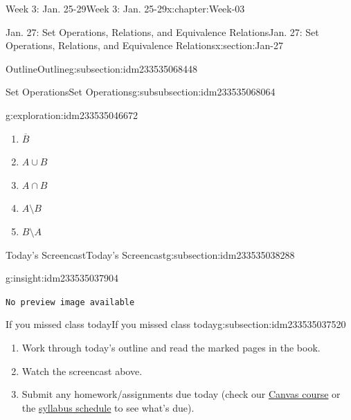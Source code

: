 \documentclass[oneside,10pt,]{book}
\newcommand{\mono}[1]{\texttt{#1}}
\numberwithin{equation}{section}
\newlength{\qrsize}
\newlength{\previewwidth}
\renewcommand{\bar}{\overline}
\begin{document}
\begin{chapterptx}{Week 3: Jan. 25-29}{}{Week 3: Jan. 25-29}{}{}{x:chapter:Week-03}
\begin{sectionptx}{Jan. 27: Set Operations, Relations, and Equivalence Relations}{}{Jan. 27: Set Operations, Relations, and Equivalence Relations}{}{}{x:section:Jan-27}
\begin{subsectionptx}{Outline}{}{Outline}{}{}{g:subsection:idm233535068448}
\begin{subsubsectionptx}{Set Operations}{}{Set Operations}{}{}{g:subsubsection:idm233535068064}
\begin{exploration}{}{g:exploration:idm233535046672}
\begin{enumerate}
\item{}\(\displaystyle {\bar B}\)%
\item{}\(\displaystyle A\cup B\)%
\item{}\(\displaystyle A\cap B\)%
\item{}\(\displaystyle A\setminus B\)%
\item{}\(\displaystyle B\setminus A\)%
\end{enumerate}
\end{exploration}%
\end{subsubsectionptx}
\end{subsectionptx}
%
%
\typeout{************************************************}
\typeout{************************************************}
%
\begin{subsectionptx}{Today's Screencast}{}{Today's Screencast}{}{}{g:subsection:idm233535038288}
\begin{insight}{}{g:insight:idm233535037904}%
\setlength{\qrsize}{9em}
\setlength{\previewwidth}{\linewidth}
\addtolength{\previewwidth}{-\qrsize}
\begin{tcbraster}[raster columns=2, raster column skip=1pt, raster halign=center, raster force size=false, raster left skip=0pt, raster right skip=0pt]%
\begin{tcolorbox}[previewstyle, width=\previewwidth]%
\mono{No preview image available}%
\end{tcolorbox}%
\begin{tcolorbox}[qrstyle]%
[QR LINK]\end{tcolorbox}%
\end{tcbraster}%
\end{insight}
\end{subsectionptx}
%
%
\typeout{************************************************}
\typeout{************************************************}
%
\begin{subsectionptx}{If you missed class today}{}{If you missed class today}{}{}{g:subsection:idm233535037520}
%
\begin{enumerate}
\item{}Work through today's outline and read the marked pages in the book.%
\item{}Watch the screencast above.%
\item{}Submit any homework\slash{}assignments due today (check our \href{https://dordt.instructure.com/courses/3110050}{Canvas course} or the \href{https://prof.mkjanssen.org/ds/index.html\#schedule}{syllabus schedule} to see what's due).%

\end{enumerate}
\end{subsectionptx}
\end{sectionptx}
\end{chapterptx}
\end{document}
